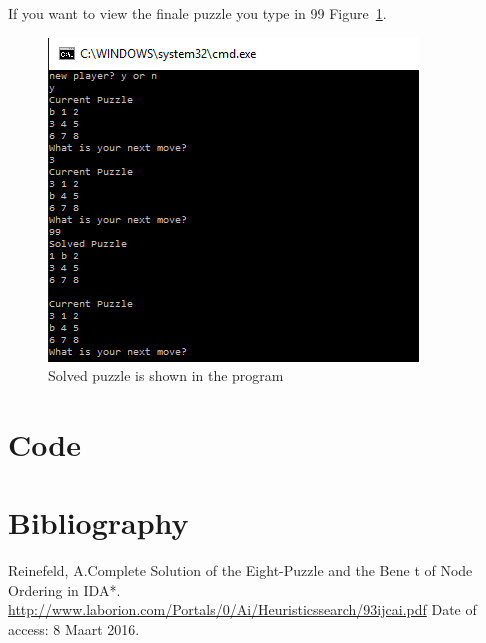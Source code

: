 \documentclass[10pt]{article}
\begin{document}
If you want to view the finale puzzle you type in 99 Figure~\ref{prent7}.
\begin{figure}
\centering
\includegraphics[scale=0.8]{./Prente/prent7.png}
\caption{Solved puzzle is shown in the program}
\label{prent7}
\end{figure}

\section{Code}
 \begin{tiny}
 
   \end{tiny}
   \section{Bibliography}
   Reinefeld, A.Complete Solution of the Eight-Puzzle and the Bene t of Node Ordering in IDA*.
   \url{http://www.laborion.com/Portals/0/Ai/Heuristicssearch/93ijcai.pdf} Date of access: 8 Maart 2016.
 
\end{document}
